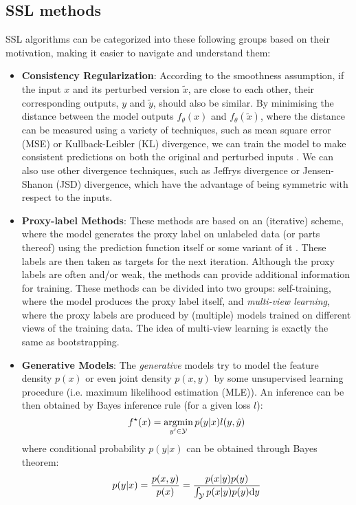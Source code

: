 \subsection*{SSL methods}
SSL algorithms can be categorized into these following groups based on their motivation, making it easier to navigate and understand them\cite{ssl-overview-2020}:
\begin{itemize}
        \item \textbf{Consistency Regularization}: According to the smoothness assumption, if the input $x$ and its perturbed version $\tilde{x}$, 
        are close to each other, their corresponding outputs, $y$ and $\tilde{y}$, should also be similar. By minimising the distance between the model outputs
        $f_\theta(x)$ and $f_\theta(\tilde{x})$, where the distance can be measured using a variety of techniques, such as mean square error (MSE) or 
        Kullback-Leibler (KL) divergence, we can train the model to make consistent predictions on both the original and perturbed inputs
        \cite{temporal-ensembling-2017,regularization-&-pertrubations-2016}.
        We can also use other divergence techniques, such as Jeffrys divergence or Jensen-Shanon (JSD) divergence, which have the advantage of 
        being symmetric with respect to the inputs.
    \item \textbf{Proxy-label Methods}: These methods are based on an (iterative) scheme, where the model generates the proxy label on unlabeled data (or parts 
        thereof) using the prediction function itself or some variant of it \cite{psuedo-label-2013}. These labels are then taken as targets for the next iteration. Although the proxy labels
        are often and/or weak, the methods can provide additional information for training. These methods can be divided into two groups: self-training, where
        the model produces the proxy label itself, and \textit{multi-view learning}, where the proxy labels are produced by (multiple) models trained on different 
        views of the training data. The idea of multi-view learning is exactly the same as bootstrapping.


    \item \textbf{Generative Models}:\label{generative-modelling} The \textit{generative} models try to model the feature density $p(x)$ or even joint density $p(x,y)$ by some unsupervised learning procedure (i.e. maximum
        likelihood estimation (MLE)). An inference can be then obtained by Bayes inference rule (for a given loss $l$):
        \begin{equation*}
            f^{\star}(x) = \mathop{\rm argmin}_{y^\prime\in \mathcal{Y}} p(y|x)l(y,\hat{y})
        \end{equation*}
        where conditional probability $p(y|x)$ can be obtained through Bayes theorem:
        \begin{equation*}
            p(y|x) = \frac{p(x,y)}{p(x)} =\frac{p(x|y)p(y)}{\int_\mathcal{Y} p(x|y)p(y) \mbox{\rm d}y}
        \end{equation*}


\end{itemize}
